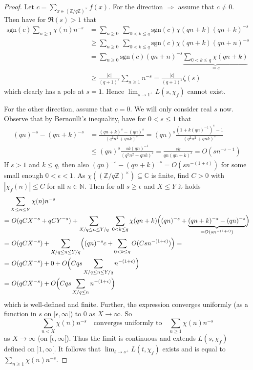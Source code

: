 \documentclass{scrartcl}
\newcommand{\N}{\mathbb{N}}
\newcommand{\Z}{\mathbb{Z}}
\newcommand{\C}{\mathbb{C}}
\newcommand{\units}{\times}
\newcommand{\sgn}{\mathrm{sgn}}
\theoremstyle{definition}
\begin{document}
\begin{proof}
    Let $c = \sum_{x \in (\Z/q\Z)^\units} f(x)$.
    For the direction $\Rightarrow$ assume that $c \neq 0$.
    Then have for $\Re(s) > 1$ that
    \begin{align*}
        \sgn(c) \sum_{n \geq 1} \chi(n) n^{-s} &= \sum_{n \geq 0} \ \sum_{0 < k \leq q} \sgn(c) \chi(qn + k) (qn + k)^{-s} \\
        &\geq \sum_{n \geq 0} \ \sum_{0 < k \leq q}\sgn(c) \chi(qn + k) (qn + n)^{-s} \\
        &= \sum_{n \geq 0} \sgn(c) (qn + n)^{-s} \underbrace{\sum_{0 < k \leq q} \chi(qn + k)}_{= c} \\
        &\geq \frac {|c|} {(q + 1)^s} \sum_{n \geq 1} n^{-s} = \frac {|c|} {(q + 1)^s} \zeta(s)
    \end{align*}
    which clearly has a pole at $s = 1$. Hence $\lim_{s \to 1^+} L(s, \chi_f)$ cannot exist.

    For the other direction, assume that $c = 0$.
    We will only consider real $s$ now.
    Observe that by Bernoulli's inequality, have for $0 < s \leq 1$ that
    \begin{align*}
        (qn)^{-s} - (qn + k)^{-s} &= \frac {(qn + k)^s - (qn)^s} {(q^2n^2 + qnk)^s} = (qn)^{s} \frac {(1 + k(qn)^{-1})^s - 1} {(q^2n^2 + qnk)^s} \\
        &\leq (qn)^s \frac {sk(qn)^{-1}} {(q^2n^2 + qnk)^s} = \frac {sk} {qn(qn + k)^s} = O(sn^{-s - 1})
    \end{align*}
    If $s > 1$ and $k \leq q$, then also $(qn)^{-s} - (qn + k)^{-s} = O(sn^{-(1 + \epsilon)})$ for some small enough $0 < \epsilon < 1$.
    As $\chi((\Z/q\Z)^\units) \subseteq \C$ is finite, find $C > 0$ with $|\chi_f(n)| \leq C$ for all $n \in \N$. 
    Then for all $s \geq \epsilon$ and $X \leq Y$ it holds
    \begin{align*}
        &\sum_{X \leq n \leq Y} \chi(n) n^{-s} \\
        =& \ O(qCX^{-s} + qCY^{-s}) + \sum_{X/q \leq n \leq Y/q} \ \sum_{0 < k \leq q} \chi(qn + k) \Bigl( (qn)^{-s} + \underbrace{(qn + k)^{-s} - (qn)^{-s}}_{= O(sn^{-(1 + \epsilon)})} \Bigr) \\
        =& \ O(qCX^{-s}) + \sum_{X/q \leq n \leq Y/q} \Bigl( (qn)^{-s} c + \sum_{0 < k \leq q} O(Csn^{-(1 + \epsilon)}) \Bigr) = \\
        =& \ O(qCX^{-s}) + 0 + O\Bigl( Cqs \sum_{X/q \leq n \leq Y/q} n^{-(1 + \epsilon)} \Bigr) \\
        =& \ O(qCX^{-s}) + O\Bigl( Cqs \sum_{X/q \leq n} n^{-(1 + \epsilon)} \Bigr)
    \end{align*}
    which is well-defined and finite.
    Further, the expression converges uniformly (as a function in $s$ on $[\epsilon, \infty[$) to $0$ as $X \to \infty$. 
    So
    \begin{equation*}
        \sum_{n < X} \chi(n) n^{-s} \quad \text{converges uniformly to} \quad \sum_{n \geq 1} \chi(n) n^{-s}
    \end{equation*}
    as $X \to \infty$ (on $[\epsilon, \infty[$). 
    Thus the limit is continuous and extends $L(s, \chi_f)$ defined on $]1, \infty[$.
    It follows that $\lim_{t \to s^+} L(t, \chi_f)$ exists and is equal to $\sum_{n \geq 1} \chi(n) n^{-s}$.
\end{proof}
\end{document}
